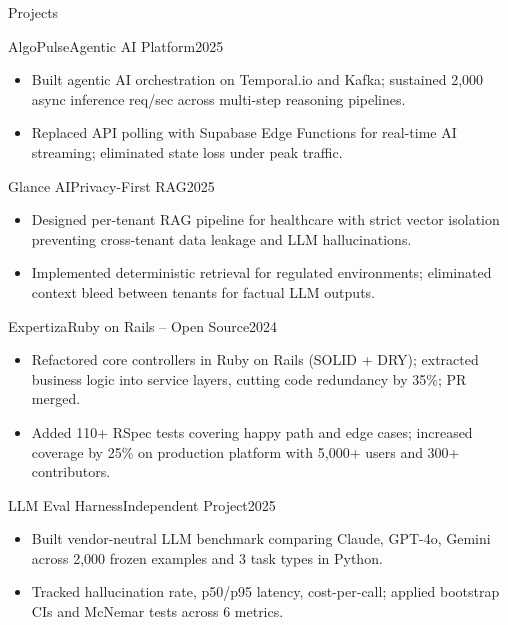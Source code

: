 \documentclass[]{mcdowellcv}
\begin{document}
\begin{cvsection}{Projects}
  \begin{cvsubsection}{AlgoPulse}{Agentic AI Platform}{2025}
    \begin{itemize}
      \item Built agentic AI orchestration on Temporal.io and Kafka; sustained 2,000 async inference req/sec across multi-step reasoning pipelines.
      \item Replaced API polling with Supabase Edge Functions for real-time AI streaming; eliminated state loss under peak traffic.
    \end{itemize}
    \vspace{-1.5pt}
  \end{cvsubsection}

  \begin{cvsubsection}{Glance AI}{Privacy-First RAG}{2025}
    \begin{itemize}
      \item Designed per-tenant RAG pipeline for healthcare with strict vector isolation preventing cross-tenant data leakage and LLM hallucinations.
      \item Implemented deterministic retrieval for regulated environments; eliminated context bleed between tenants for factual LLM outputs.
    \end{itemize}
    \vspace{-1.5pt}
  \end{cvsubsection}

  \begin{cvsubsection}{Expertiza}{Ruby on Rails -- Open Source}{2024}
    \begin{itemize}
      \item Refactored core controllers in Ruby on Rails (SOLID + DRY); extracted business logic into service layers, cutting code redundancy by 35\%; PR merged.
      \item Added 110+ RSpec tests covering happy path and edge cases; increased coverage by 25\% on production platform with 5,000+ users and 300+ contributors.
    \end{itemize}
    \vspace{-1.5pt}
  \end{cvsubsection}

  \begin{cvsubsection}{LLM Eval Harness}{Independent Project}{2025}
    \begin{itemize}
      \item Built vendor-neutral LLM benchmark comparing Claude, GPT-4o, Gemini across 2,000 frozen examples and 3 task types in Python.
      \item Tracked hallucination rate, p50/p95 latency, cost-per-call; applied bootstrap CIs and McNemar tests across 6 metrics.
    \end{itemize}
  \end{cvsubsection}
\end{cvsection}
\end{document}
